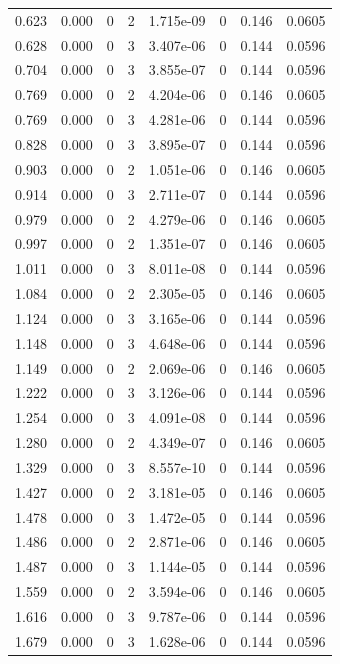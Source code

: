 \documentclass[preview]{standalone}
\begin{document}
{{\begin{tabular}{L{1.2cm}C{1.2cm} C{0.3cm}C{0.5cm} C{1.4cm}C{1.4cm} C{1.4cm}C{1.4cm}}
  0.623  &  0.000  & 0     &  2 &  1.715e-09  & 0  & 0.146 &  0.0605   \\ 
  0.628  &  0.000  & 0     &  3 &  3.407e-06  & 0  & 0.144 &  0.0596   \\ 
  0.704  &  0.000  & 0     &  3 &  3.855e-07  & 0  & 0.144 &  0.0596   \\ 
  0.769  &  0.000  & 0     &  2 &  4.204e-06  & 0  & 0.146 &  0.0605   \\ 
  0.769  &  0.000  & 0     &  3 &  4.281e-06  & 0  & 0.144 &  0.0596   \\ 
  0.828  &  0.000  & 0     &  3 &  3.895e-07  & 0  & 0.144 &  0.0596   \\ 
  0.903  &  0.000  & 0     &  2 &  1.051e-06  & 0  & 0.146 &  0.0605   \\ 
  0.914  &  0.000  & 0     &  3 &  2.711e-07  & 0  & 0.144 &  0.0596   \\ 
  0.979  &  0.000  & 0     &  2 &  4.279e-06  & 0  & 0.146 &  0.0605   \\ 
  0.997  &  0.000  & 0     &  2 &  1.351e-07  & 0  & 0.146 &  0.0605   \\ 
  1.011  &  0.000  & 0     &  3 &  8.011e-08  & 0  & 0.144 &  0.0596   \\ 
  1.084  &  0.000  & 0     &  2 &  2.305e-05  & 0  & 0.146 &  0.0605   \\ 
  1.124  &  0.000  & 0     &  3 &  3.165e-06  & 0  & 0.144 &  0.0596   \\ 
  1.148  &  0.000  & 0     &  3 &  4.648e-06  & 0  & 0.144 &  0.0596   \\ 
  1.149  &  0.000  & 0     &  2 &  2.069e-06  & 0  & 0.146 &  0.0605   \\ 
  1.222  &  0.000  & 0     &  3 &  3.126e-06  & 0  & 0.144 &  0.0596   \\ 
  1.254  &  0.000  & 0     &  3 &  4.091e-08  & 0  & 0.144 &  0.0596   \\ 
  1.280  &  0.000  & 0     &  2 &  4.349e-07  & 0  & 0.146 &  0.0605   \\ 
  1.329  &  0.000  & 0     &  3 &  8.557e-10  & 0  & 0.144 &  0.0596   \\ 
  1.427  &  0.000  & 0     &  2 &  3.181e-05  & 0  & 0.146 &  0.0605   \\ 
  1.478  &  0.000  & 0     &  3 &  1.472e-05  & 0  & 0.144 &  0.0596   \\ 
  1.486  &  0.000  & 0     &  2 &  2.871e-06  & 0  & 0.146 &  0.0605   \\ 
  1.487  &  0.000  & 0     &  3 &  1.144e-05  & 0  & 0.144 &  0.0596   \\ 
  1.559  &  0.000  & 0     &  2 &  3.594e-06  & 0  & 0.146 &  0.0605   \\ 
  1.616  &  0.000  & 0     &  3 &  9.787e-06  & 0  & 0.144 &  0.0596   \\ 
  1.679  &  0.000  & 0     &  3 &  1.628e-06  & 0  & 0.144 &  0.0596   \\ 
\hline 
\end{tabular} 

}}
\end{document}
